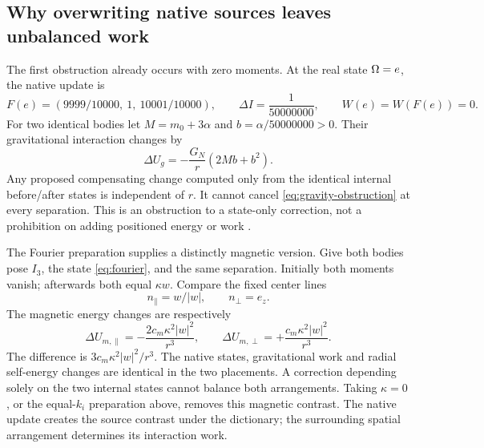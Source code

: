 \subsection{Why overwriting native sources leaves unbalanced work}
The first obstruction already occurs with zero moments. At the real state \(\Omega=e\), the native update is
\[
 F(e)=(9999/10000,\ 1,\ 10001/10000),\qquad
 \Delta I=\frac1{50000000},\qquad W(e)=W(F(e))=0.
\]
For two identical bodies let \(M=m_0+3\alpha\) and \(b=\alpha/50000000>0\). Their gravitational interaction changes by
\begin{equation}
 \Delta U_g=-\frac{G_N}{r}(2Mb+b^2). \label{eq:gravity-obstruction}
\end{equation}
Any proposed compensating change computed only from the identical internal before/after states is independent of \(r\). It cannot cancel \eqref{eq:gravity-obstruction} at every separation. This is an obstruction to a state-only correction, not a prohibition on adding positioned energy or work \cite{GM01,GM02}.

The Fourier preparation supplies a distinctly magnetic version. Give both bodies pose \(I_3\), the state \eqref{eq:fourier}, and the same separation. Initially both moments vanish; afterwards both equal \(\kappa w\). Compare the fixed center lines
\[
 n_\parallel=w/|w|,\qquad n_\perp=e_z.
\]
The magnetic energy changes are respectively
\begin{equation}
 \Delta U_{m,\parallel}=-\frac{2c_m\kappa^2|w|^2}{r^3},\qquad
 \Delta U_{m,\perp}=+\frac{c_m\kappa^2|w|^2}{r^3}.
 \label{eq:mag-obstruction}
\end{equation}
The difference is \(3c_m\kappa^2|w|^2/r^3\). The native states, gravitational work and radial self-energy changes are identical in the two placements. A correction depending solely on the two internal states cannot balance both arrangements. Taking \(\kappa=0\), or the equal-\(k_i\) preparation above, removes this magnetic contrast. The native update creates the source contrast under the dictionary; the surrounding spatial arrangement determines its interaction work.
